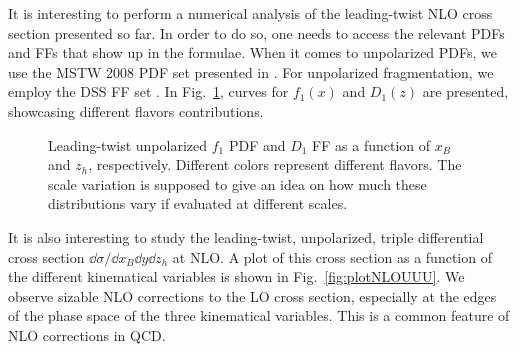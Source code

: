 It is interesting to perform a numerical analysis of the leading-twist NLO cross section presented so far. In order to do so, one needs to access the relevant PDFs and FFs that show up in the formulae. When it comes to unpolarized PDFs, we use the MSTW 2008 PDF set presented in \cite{Martin2009}. For unpolarized fragmentation, we employ the DSS FF set \cite{deFlorian2007}. In Fig.~\ref{fig:f1D1}, curves for $f_1(x)$ and $D_1(z)$ are presented, showcasing different flavors contributions.
\begin{figure}
    \centering
    \hfill
    \caption{Leading-twist unpolarized $f_1$ PDF and $D_1$ FF as a function of $x_B$ and $z_h$, respectively. Different colors represent different flavors. The scale variation is supposed to give an idea on how much these distributions vary if evaluated at different scales.}
    \label{fig:f1D1}
\end{figure}
It is also interesting to study the leading-twist, unpolarized, triple differential cross section $\dd \sigma/\dd x_B \dd y \dd z_h$ at NLO. A plot of this cross section as a function of the different kinematical variables is shown in Fig.~\ref{fig:plotNLOUUU}. We observe sizable NLO corrections to the LO cross section, especially at the edges of the phase space of the three kinematical variables. This is a common feature of NLO corrections in QCD.
